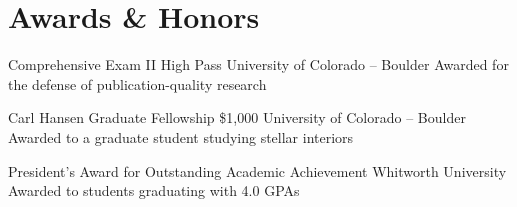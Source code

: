 \section{Awards \& Honors}

		{Comprehensive Exam II High Pass}
		{}
		{University of Colorado -- Boulder}
		{}
		{Awarded for the defense of publication-quality research}

        {Carl Hansen Graduate Fellowship}
        {\$1,000}
        {University of Colorado -- Boulder}
        {}
        {Awarded to a graduate student studying stellar interiors}


        {President's Award for Outstanding Academic Achievement}
        {}
        {Whitworth University}
        {}
        {Awarded to students graduating with 4.0 GPAs}

